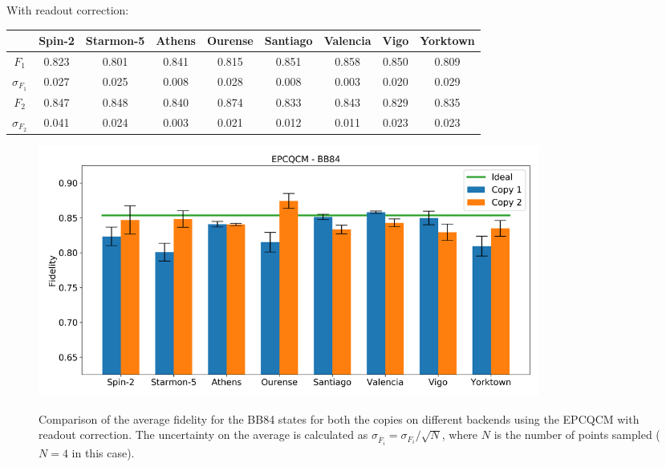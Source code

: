 With readout correction:
\begin{table}[H]
    \centering
    \begin{tabular}{|c|c|c|c|c|c|c|c|c|}
    \hline
    \textbf{} & \textbf{Spin-2} & \textbf{Starmon-5} & \textbf{Athens} & \textbf{Ourense} & \textbf{Santiago} & \textbf{Valencia} & \textbf{Vigo} & \textbf{Yorktown} \\ \hline
    $F_1$              & 0.823 & 0.801 & 0.841 & 0.815 & 0.851 & 0.858 & 0.850 & 0.809 \\ \hline
    $\sigma_{F_1}$     & 0.027 & 0.025 & 0.008 & 0.028 & 0.008 & 0.003 & 0.020 & 0.029 \\ \hline
    $F_2$              & 0.847 & 0.848 & 0.840 & 0.874 & 0.833 & 0.843 & 0.829 & 0.835 \\ \hline
    $\sigma_{F_2}$     & 0.041 & 0.024 & 0.003 & 0.021 & 0.012 & 0.011 & 0.023 & 0.023 \\ \hline
    \end{tabular}
\end{table}
\begin{figure}[H]
  \centering
          \includegraphics[width=0.8\textwidth]{Figures/Economical/Histograms/histo_bb84_corrected.png}
      \label{fig:epc_histo_bb84_corrected}
      \caption{Comparison of the average fidelity for the BB84 states for both the copies on different backends using the EPCQCM with readout correction. The uncertainty on the average is calculated as $\sigma_{\overline{F}_i}=\sigma_{F_i}/\sqrt{N}$, where $N$ is the number of points sampled ($N=4$ in this case).}
\end{figure}


